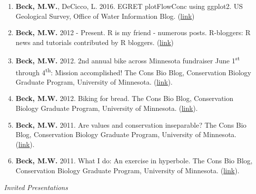 \documentclass[letterpaper,12pt]{article}
\begin{document}
\begin{enumerate}

\item \textbf{Beck, M.W.}, DeCicco, L. 2016. EGRET plotFlowConc using ggplot2. US Geological Survey, Office of Water Information Blog. (\href{https://owi.usgs.gov/blog/plotFlowConc/}{link})

\item \textbf{Beck, M.W.} 2012 - Present. R is my friend - numerous posts. R-bloggers: R news and tutorials contributed by R bloggers. (\href{https://beckmw.wordpress.com/}{link})

\item \textbf{Beck, M.W.} 2012. 2nd annual bike across Minnesota fundraiser June 1\textsuperscript{st} through 4\textsuperscript{th}: Mission accomplished! The Cons Bio Blog, Conservation Biology Graduate Program, University of Minnesota. (\href{https://consbioumn.wordpress.com/2012/06/25/2nd-annual-bike-across-minnesota-fundraiser-june-1st-through-4th-mission-accomplished/}{link}).

\item \textbf{Beck, M.W.} 2012. Biking for bread. The Cons Bio Blog, Conservation Biology Graduate Program, University of Minnesota. (\href{https://consbioumn.wordpress.com/2012/05/01/biking-for-bread/}{link}).

\item \textbf{Beck, M.W.} 2011. Are values and conservation inseparable? The Cons Bio Blog, Conservation Biology Graduate Program, University of Minnesota. (\href{https://consbioumn.wordpress.com/2011/09/21/are-values-and-conservation-inseparable/}{link}).

\item \textbf{Beck, M.W.} 2011. What I do: An exercise in hyperbole. The Cons Bio Blog, Conservation Biology Graduate Program, University of Minnesota. (\href{https://consbioumn.wordpress.com/2011/02/15/what-i-do-an-exercise-in-hyperbole/}{link}).

\end{enumerate}

\vspace{\baselineskip} 
\centerline{\large{\textit{Invited Presentations}}}
\end{document}
